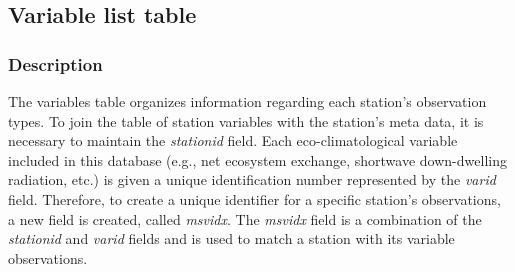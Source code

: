 \subsection{Variable list table}
\label{sec:dbvt}

\subsubsection{Description}
\label{sec:dbvtdes}
The variables table organizes information regarding each station's observation types.  
To join the table of station variables with the station's meta data, it is necessary to maintain the \emph{stationid} field.  
Each eco-climatological variable included in this database (e.g., net ecosystem exchange, shortwave down-dwelling radiation, etc.) is given a unique identification number represented by the \emph{varid} field.  
Therefore, to create a unique identifier for a specific station's observations, a new field is created, called \emph{msvidx}. 
The \emph{msvidx} field is a combination of the \emph{stationid} and \emph{varid} fields and is used to match a station with its variable observations.

